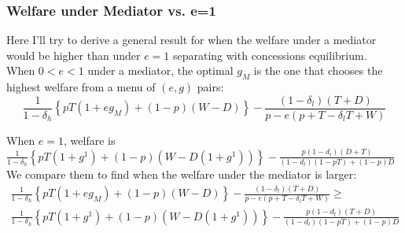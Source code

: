 \documentclass[12pt]{article}
\newcommand{\de}{\delta}
\begin{document}
\subsubsection{Welfare under Mediator vs. e=1}
\label{sec:WM1}
Here I'll try to derive a general result for when the welfare under a mediator would be higher than under $e=1$ separating with concessions equilibrium. \\

When $0<e<1$ under a mediator, the optimal $g_M$ is the one that chooses the highest welfare from a menu of $(e,g)$ pairs:
$$\frac{1}{1-\de_h}\left\{pT(1+eg_M) + (1-p)(W-D)\right\} - \frac{\left(1 - \de_l \right) \left( T + D \right)}{p - e \left( p + T - \de_l T + W \right)}$$

When $e=1$, welfare is $\frac{1}{1-\de_h}\left\{pT(1+g^1) + (1-p)(W-D(1+g^1))\right\} - \frac{p(1-d_l)(D+T)}{(1-d_l)(1-pT)+(1-p)D}$ \\

We compare them to find when the welfare under the mediator is larger:
	\begin{multline*}
		\frac{1}{1-\de_h}\left\{pT(1+eg_M) + (1-p)(W-D)\right\} - \frac{\left(1 - \de_l \right) \left( T + D \right)}{p - e \left( p + T - \de_l T + W \right)} \geq \\
		\frac{1}{1-\de_h}\left\{pT(1+g^1) + (1-p)(W-D(1+g^1))\right\} - \frac{p(1-d_l)(T+D)}{(1-d_l)(1-pT)+(1-p)D}
	\end{multline*}						
		
\end{document}
